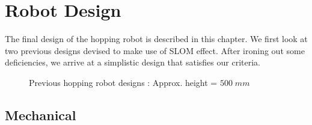 \chapter{Robot Design}
\label{chap:mech_design}

The final design of the hopping robot is described in this chapter. We first look at two previous designs devised to make use of SLOM effect. After ironing out some deficiencies, we arrive at a simplistic design that satisfies our criteria.
\begin{figure}[H]
\centering
{}
\caption{Previous hopping robot designs : Approx. height = $500\;mm$}
\label{fig:3_prevdes}
\end{figure}

\section{Mechanical}
